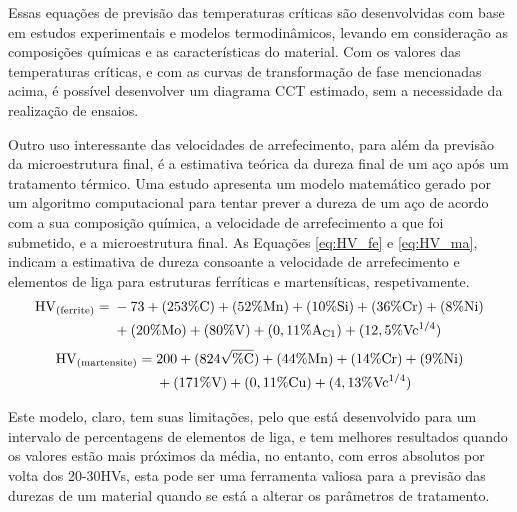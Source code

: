 \par
Essas equações de previsão das temperaturas críticas são desenvolvidas com base em estudos experimentais e modelos termodinâmicos, levando em consideração as composições químicas e as características do material. Com os valores das temperaturas críticas, e com as curvas de transformação de fase mencionadas acima, é possível desenvolver um diagrama CCT estimado, sem a necessidade da realização de ensaios.
\par
Outro uso interessante das velocidades de arrefecimento, para além da previsão da microestrutura final, é a estimativa teórica da dureza final de um aço após um tratamento térmico. Uma estudo apresenta um modelo matemático gerado por um algoritmo computacional para tentar prever a dureza de um aço de acordo com a sua composição química, a velocidade de arrefecimento a que foi submetido, e a microestrutura final\cite{Trzaska2016}. As Equações \ref{eq:HV_fe} e \ref{eq:HV_ma}, indicam a estimativa de dureza consoante a velocidade de arrefecimento e elementos de liga para estruturas ferríticas e martensíticas, respetivamente.
\begin{equation}
    \begin{aligned}
    \mathrm{HV\textsubscript{(ferrite)}} = {}   & -73 + (253\%\mathrm{C}) + (52\%\mathrm{Mn}) + (10\%\mathrm{Si}) + (36\%\mathrm{Cr}) + (8\%\mathrm{Ni})\\
                                                & + (20\%\mathrm{Mo}) + (80\%\mathrm{V}) + (0,11\%\mathrm{A\textsubscript{C1}}) + (12,5\%\mathrm{Vc\textsuperscript{1/4}})
    \end{aligned}
    \label{eq:HV_fe}
\end{equation}
\begin{equation}
    \begin{aligned}
    \mathrm{HV\textsubscript{(martensite)}} = {}    & 200 + (824\sqrt{\%\mathrm{C}}) + (44\%\mathrm{Mn}) + (14\%\mathrm{Cr}) + (9\%\mathrm{Ni})\\
                                                    &+ (171\%\mathrm{V}) + (0,11\%\mathrm{Cu}) + (4,13\%\mathrm{Vc\textsuperscript{1/4}})
    \end{aligned}
    \label{eq:HV_ma}
\end{equation}
\par
Este modelo, claro, tem suas limitações, pelo que está desenvolvido para um intervalo de percentagens de elementos de liga, e tem melhores resultados quando os valores estão mais próximos da média, no entanto, com erros absolutos por volta dos 20-30HVs, esta pode ser uma ferramenta valiosa para a previsão das durezas de um material quando se está a alterar os parâmetros de tratamento. 